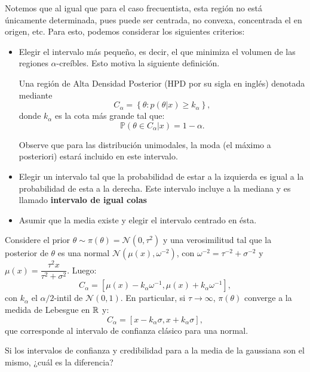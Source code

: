 Notemos que al igual que para el caso frecuentista, esta región no está únicamente determinada, pues puede ser centrada, no convexa, concentrada el en origen, etc. Para esto, podemos considerar los siguientes criterios: 

\begin{itemize}
    \item Elegir el intervalo más pequeño, es decir,  el que minimiza el volumen de las regiones $\alpha$-creíbles. Esto motiva la siguiente definición.
    \begin{definition}
    Una región de Alta Densidad Posterior (HPD por su sigla en inglés) denotada mediante 
    $$
    C_{\alpha}  = \left \{ \theta: p(\theta|x) \geq  k_{\alpha}\right \} ,
    $$
    donde $k_{\alpha}$ es la cota más grande tal que: 
    $$
    \mathbb{P}(\theta \in C_{\alpha}|x) = 1- \alpha.
    $$
    \end{definition}

     Observe que para las distribución unimodales, la moda (el máximo a posteriori) estará incluido en este intervalo. 
     
     \item Elegir un intervalo tal que la probabilidad de estar a la izquierda es igual a la probabilidad de esta a la derecha. Este intervalo incluye a la mediana y es llamado \textbf{intervalo de igual colas}
     \item Asumir que la media existe y elegir el intervalo centrado en ésta.
\end{itemize}



\begin{example}
Considere el prior $\theta \sim \pi(\theta) =  \mathcal{N}(0,\tau^{2})$ y una verosimilitud tal que la posterior de $\theta$ es una normal $\mathcal{N}(\mu(x),\omega^{-2})$, con $\omega^{-2}= \tau^{-2} + \sigma^{-2} $
y $\mu(x)=\dfrac{\tau^{2}x}{\tau^2 + \sigma^2}$. Luego: 
$$
C_{\alpha} =[\mu(x) - k_{\alpha}\omega^{-1},\mu(x)+k_{\alpha}\omega^{-1} ],
$$
con $k_{\alpha}$ el $\alpha /2 $-intil de $\mathcal{N}(0,1)$. En particular, si $\tau \to \infty$, $\pi(\theta)$ converge a la medida de Lebesgue en ${\mathbb R} $ y: 
$$
C_{\alpha}= [x - k_{\alpha}\sigma ,x + k_{\alpha}\sigma],
$$
que corresponde al intervalo de confianza clásico para una normal. 
\end{example}


\begin{remark}
    Si los intervalos de confianza y credibilidad para a la media de la gaussiana son el mismo, ¿cuál es la diferencia? 
\end{remark}

